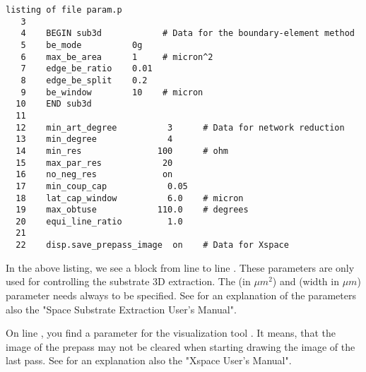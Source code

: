 \small \begin{Verbatim}[frame=single]
listing of file param.p
   3
   4    BEGIN sub3d            # Data for the boundary-element method
   5    be_mode          0g
   6    max_be_area      1     # micron^2
   7    edge_be_ratio    0.01
   8    edge_be_split    0.2
   9    be_window        10    # micron
  10    END sub3d
  11
  12    min_art_degree          3      # Data for network reduction
  13    min_degree              4
  14    min_res               100      # ohm
  15    max_par_res            20
  16    no_neg_res             on
  17    min_coup_cap            0.05
  18    lat_cap_window          6.0    # micron
  19    max_obtuse            110.0    # degrees
  20    equi_line_ratio         1.0
  21
  22    disp.save_prepass_image  on    # Data for Xspace
\end{Verbatim}
\normalsize
In the above listing, we see a  block from line  to line .
These parameters are only used for controlling the substrate 3D extraction.
The  (in $\mu m^2$) and  (width in $\mu m$) parameter
needs always to be specified.
See for an explanation of the parameters also the "Space Substrate Extraction User's Manual".

On line , you find a parameter for the visualization tool .
It means, that the image of the prepass may not be cleared
when starting drawing the image of the last pass.
See for an explanation also the "Xspace User's Manual".

